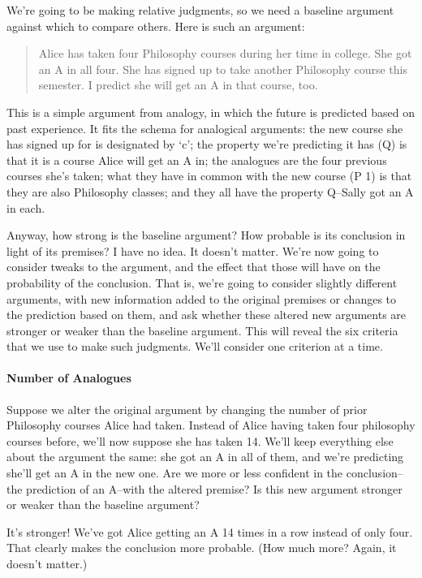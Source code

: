 We're going to be making relative judgments, so we need a baseline argument against which to
compare others. Here is such an argument:

\begin{quote}Alice has taken four Philosophy courses during her time in college. She got an A in all
four. She has signed up to take another Philosophy course this semester. I predict she will
get an A in that course, too.
\end{quote}

This is a simple argument from analogy, in which the future is predicted based on past experience.
It fits the schema for analogical arguments: the new course she has signed up for is designated by
`c'; the property we're predicting it has (Q) is that it is a course Alice will get an A in; the analogues
are the four previous courses she's taken; what they have in common with the new course (P 1) is
that they are also Philosophy classes; and they all have the property Q--Sally got an A in each.

Anyway, how strong is the baseline argument? How probable is its conclusion in light of its
premises? I have no idea. It doesn't matter. We're now going to consider tweaks to the argument,
and the effect that those will have on the probability of the conclusion. That is, we're going to
consider slightly different arguments, with new information added to the original premises or
changes to the prediction based on them, and ask whether these altered new arguments are stronger
or weaker than the baseline argument. This will reveal the six criteria that we use to make such
judgments. We'll consider one criterion at a time.

\paragraph{Number of Analogues}
Suppose we alter the original argument by changing the number of prior Philosophy courses Alice
had taken. Instead of Alice having taken four philosophy courses before, we'll now suppose she
has taken 14. We'll keep everything else about the argument the same: she got an A in all of them,
and we're predicting she'll get an A in the new one. Are we more or less confident in the
conclusion--the prediction of an A--with the altered premise? Is this new argument stronger or
weaker than the baseline argument?

It's stronger! We've got Alice getting an A 14 times in a row instead of only four. That clearly
makes the conclusion more probable. (How much more? Again, it doesn't matter.)

